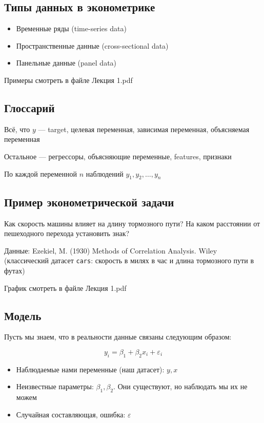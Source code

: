 \documentclass[12pt,a4paper]{article}
\numberwithin{equation}{section}
\theoremstyle{plain}
\theoremstyle{definition}
\theoremstyle{remark}
\begin{document}
\subsection{Типы данных в эконометрике}

\begin{itemize}
    \item Временные ряды (time-series data)
    \item Пространственные данные (cross-sectional data)
    \item Панельные данные (panel data)
\end{itemize}

Примеры смотреть в файле Лекция 1.pdf

\subsection{Глоссарий}

Всё, что $y$ — target, целевая переменная, зависимая переменная, объясняемая переменная

Остальное — регрессоры, объясняющие переменные, features, признаки

По каждой переменной $n$ наблюдений $y_1, y_2, \dots, y_n$

\subsection{Пример эконометрической задачи}

Как скорость машины влияет на длину тормозного пути? На каком расстоянии от пешеходного перехода установить знак?

Данные: Ezekiel, M. (1930) Methods of Correlation Analysis. Wiley (классический датасет \texttt{cars}: скорость в милях в час и длина тормозного пути в футах)

График смотреть в файле Лекция 1.pdf

\subsection{Модель}

Пусть мы знаем, что в реальности данные связаны следующим образом:

$$
    y_i = \beta_1 + \beta_2 x_i + \varepsilon_i
$$

\begin{itemize}
    \item Наблюдаемые нами переменные (наш датасет): $y, x$
    \item Неизвестные параметры: $\beta_1, \beta_2$. Они существуют, но наблюдать мы их не можем
    \item Случайная составляющая, ошибка: $\varepsilon$
\end{itemize}
\end{document}
